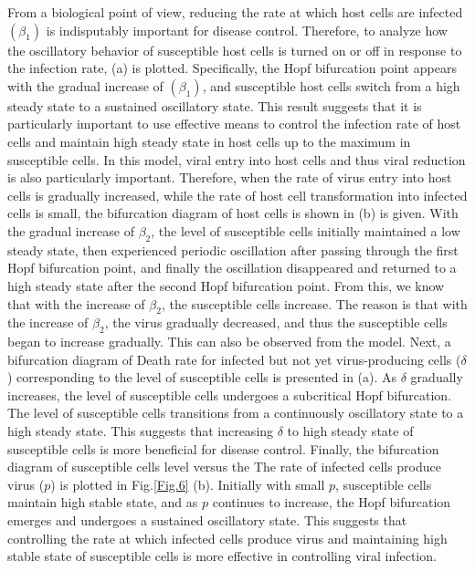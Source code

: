 \documentclass{CMHPhD-SIVD}
\begin{document}
From a biological point of view, reducing the rate at which host cells are infected $(\beta_1)$ is indisputably important for disease control. Therefore, to analyze how the oscillatory behavior of susceptible host cells is turned on or off in response to the infection rate, (a) is plotted. Specifically, the Hopf bifurcation point appears with the gradual increase of $(\beta_1)$, and susceptible host cells switch from a high steady state to a sustained oscillatory state. This result suggests that it is particularly important to use effective means to control the infection rate of host cells and maintain high steady state in host cells up to the maximum in susceptible cells. In this model, viral entry into host cells and thus viral reduction is also particularly important. Therefore, when the rate of virus entry into host cells is gradually increased, while the rate of host cell transformation into infected cells is small, the bifurcation diagram of host cells is shown in (b) is given. With the gradual increase of $\beta_2$, the level of susceptible cells initially maintained a low steady state, then experienced periodic oscillation after passing through the first Hopf bifurcation point, and finally the oscillation disappeared and returned to a high steady state after the second Hopf bifurcation point. From this, we know that with the increase of $\beta_2$, the susceptible cells increase. The reason is that with the increase of $\beta_2$, the virus gradually decreased, and thus the susceptible cells began to increase gradually. This can also be observed from the model. Next, a bifurcation diagram of Death rate for infected but not yet virus-producing cells ($\delta$) corresponding to the level of susceptible cells is presented in  (a). As $\delta$ gradually increases, the level of susceptible cells undergoes a subcritical Hopf bifurcation. The level of susceptible cells transitions from a continuously oscillatory state to a high steady state. This suggests that increasing $\delta$ to high steady state of susceptible cells is more beneficial for disease control. Finally, the bifurcation diagram of susceptible cells level versus the The rate of infected cells produce virus ($p$) is plotted in Fig.\ref{Fig.6} (b). Initially with small $p$, susceptible cells maintain high stable state, and as $p$ continues to increase, the Hopf bifurcation emerges and undergoes a sustained oscillatory state. This suggests that controlling the rate at which infected cells produce virus and maintaining high stable state of susceptible cells is more effective in controlling viral infection.
\end{document}

